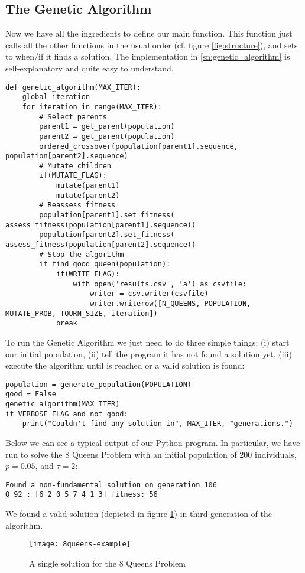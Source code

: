 \subsection{The Genetic Algorithm}\label{sec:genetic-algorithm}
Now we have all the ingredients to define our main  function. This function just calls all the other functions in the usual order (cf. figure \ref{fig:structure}), and sets  to  when/if it finds a solution. The implementation in \cref{sn:genetic_algorithm} is self-explanatory and quite easy to understand.

\begin{lstlisting}[label=sn:genetic_algorithm, caption=The Genetic Algorithm]
def genetic_algorithm(MAX_ITER):
	global iteration
	for iteration in range(MAX_ITER):
		# Select parents
		parent1 = get_parent(population)
		parent2 = get_parent(population)
		ordered_crossover(population[parent1].sequence, population[parent2].sequence)
		# Mutate children
		if(MUTATE_FLAG):
			mutate(parent1)
			mutate(parent2)
		# Reassess fitness
		population[parent1].set_fitness( assess_fitness(population[parent1].sequence))
		population[parent2].set_fitness( assess_fitness(population[parent2].sequence))
		# Stop the algorithm
		if find_good_queen(population):
			if(WRITE_FLAG):
				with open('results.csv', 'a') as csvfile:
					writer = csv.writer(csvfile)
					writer.writerow([N_QUEENS, POPULATION, MUTATE_PROB, TOURN_SIZE, iteration])
			break
\end{lstlisting}

To run the Genetic Algorithm we just need to do three simple things: (i) start our initial population, (ii) tell the program it has not found a  solution yet, (iii) execute the algorithm until  is reached or a valid solution is found:

\begin{lstlisting}[label=sn:main, caption=Instructions needed to perform the Genetic Algorithm]
population = generate_population(POPULATION)
good = False
genetic_algorithm(MAX_ITER)
if VERBOSE_FLAG and not good:
	print("Couldn't find any solution in", MAX_ITER, "generations.")
\end{lstlisting}

Below we can see a typical output of our Python program. In particular, we have run  to solve the 8 Queens Problem with an initial population of 200 individuals, $p = 0.05$, and $\tau = 2$:
\renewcommand{\lstlistingname}{Snippet}
\begin{lstlisting}[style=output, label=out:n-queens8-200]
Found a non-fundamental solution on generation 106
Q 92 : [6 2 0 5 7 4 1 3] fitness: 56
\end{lstlisting}

We found a valid solution (depicted in figure \ref{fig:8queens-example}) in third generation of the algorithm.
\begin{figure}[H]
	\centering
	\texttt{[image: 8queens-example]}
	\caption{A single solution for the 8 Queens Problem}
	\label{fig:8queens-example}
\end{figure}
